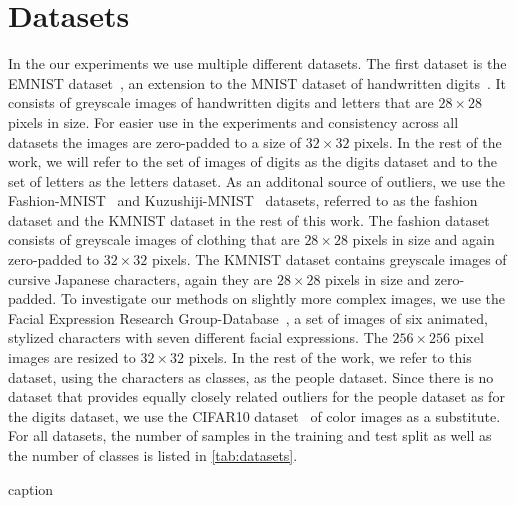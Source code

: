 \section{Datasets}%
\label{sec:datasets}

In the our experiments we use multiple different datasets. The first dataset is the
EMNIST dataset~\citep{cohenEMNISTExtensionMNIST2017}, an extension to the MNIST
dataset of handwritten digits~\citep{lecunGradientbasedLearningApplied1998}. It
consists of greyscale images of handwritten digits and letters that are $28
	\times 28$ pixels in size. For easier use in the experiments and consistency
across all datasets the images are zero-padded to a size of $32 \times 32$
pixels. In the rest of the work, we will refer to the set of images of digits
as the digits dataset and to the set of letters as the letters dataset.
As an additonal source of outliers, we use the
Fashion-MNIST~\citep{xiaoFashionmnistNovelImage2017} and
Kuzushiji-MNIST~\citep{clanuwatDeepLearningClassical2018} datasets, referred to
as the fashion dataset and the KMNIST dataset in the rest of this work. The
fashion dataset consists of greyscale images of clothing that are $28 \times
	28$ pixels in size and again zero-padded to $32 \times 32$ pixels. The KMNIST
dataset contains greyscale images of cursive Japanese characters, again they
are $28 \times 28$ pixels in size and zero-padded.
To investigate our methods on slightly more complex images, we use the Facial
Expression Research Group-Database~\citep{anejaModelingStylizedCharacter2017a},
a set of images of six animated, stylized characters with seven different
facial expressions. The $256 \times 256$ pixel images are resized to $32 \times
	32$ pixels. In the rest of the work, we refer to this dataset, using the
characters as classes, as the people dataset. Since there is no dataset that
provides equally closely related outliers for the people dataset as for the
digits dataset, we use the CIFAR10
dataset~\citep{krizhevskyLearningMultipleLayers2009} of color images as a
substitute. For all datasets, the number of samples in the training and test
split as well as the number of classes is listed in \autoref{tab:datasets}.

\begin{table}[htpb]
	\centering
	\caption{caption}
	\label{tab:datasets}
	
\end{table}
